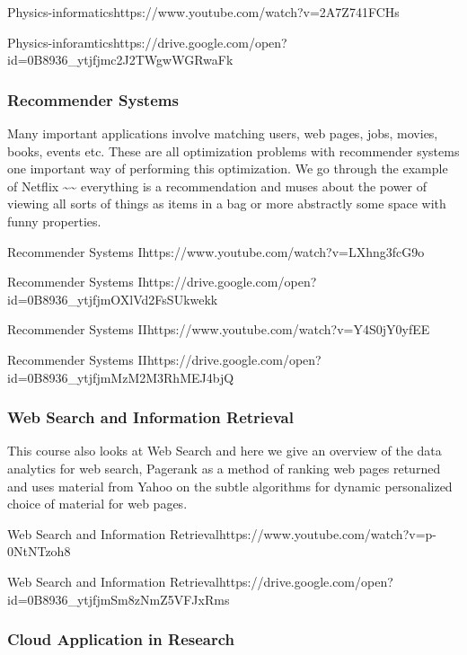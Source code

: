   {Physics-informatics}{https://www.youtube.com/watch?v=2A7Z741FCHs}

  {Physics-inforamtics}{https://drive.google.com/open?id=0B8936_ytjfjmc2J2TWgwWGRwaFk}


\subsubsection{Recommender Systems}\label{recommender-systems}

Many important applications involve matching users, web pages, jobs,
movies, books, events etc. These are all optimization problems with
recommender systems one important way of performing this optimization.
We go through the example of Netflix \textasciitilde{}\textasciitilde{}
everything is a recommendation and muses about the power of viewing all
sorts of things as items in a bag or more abstractly some space with
funny properties.


  {Recommender Systems  I}{https://www.youtube.com/watch?v=LXhng3fcG9o}



  {Recommender  Systems I}{https://drive.google.com/open?id=0B8936_ytjfjmOXlVd2FsSUkwekk}



  {Recommender Systems
  II}{https://www.youtube.com/watch?v=Y4S0jY0yfEE}

  {Recommender
  Systems II}{https://drive.google.com/open?id=0B8936_ytjfjmMzM2M3RhMEJ4bjQ}


\subsubsection{Web Search and Information
Retrieval}\label{web-search-and-information-retrieval}

This course also looks at Web Search and here we give an overview of the
data analytics for web search, Pagerank as a method of ranking web pages
returned and uses material from Yahoo on the subtle algorithms for
dynamic personalized choice of material for web pages.


   {Web Search and  Information Retrieval}{https://www.youtube.com/watch?v=p-0NtNTzoh8}


  {Web  Search and Information Retrieval}{https://drive.google.com/open?id=0B8936_ytjfjmSm8zNmZ5VFJxRms}


\subsubsection{Cloud Application in
Research}\label{cloud-application-in-research}

